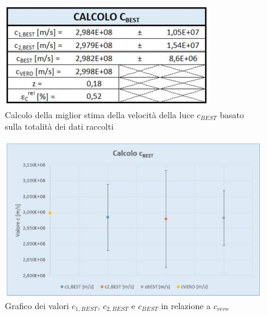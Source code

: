 \documentclass{article}
\begin{document}
\begin{figure}[h]
    \centering
    \includegraphics[width=0.5\linewidth]{Calcolo_cbest.JPG}
    \caption{Calcolo della miglior stima della velocità della luce $c_{BEST}$ basato sulla totalità dei dati raccolti}
    \label{Calcolo_cbest}
\end{figure}

\begin{figure}[h]
    \centering
    \includegraphics[width=0.8\linewidth]{Graf_cbest.JPG}
    \caption{Grafico dei valori $c_{1,BEST}$, $c_{2,BEST}$ e $c_{BEST}$ in relazione a $c_{vero}$}
    \label{Graf_cbest}
\end{figure}
\end{document}
